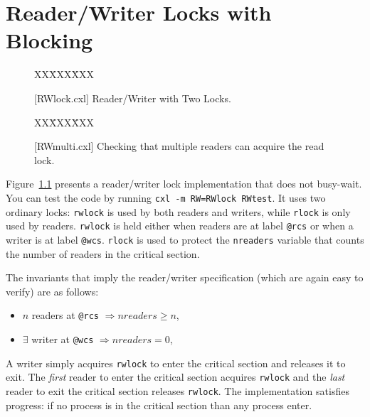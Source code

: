 \documentclass{report}
\newcommand{\cxlsource}[1]{
\begin{tabbing}
XX\=XXX\=XXX\kill
    
\end{tabbing}
}
\newenvironment{code}{
\tcolorbox
}{
\endtcolorbox
}
\begin{document}
\chapter{Reader/Writer Locks with Blocking}
\label{ch:rdwr2}

\begin{figure}
\begin{code}
\cxlsource{RWlock}
\end{code}
\caption{[RWlock.cxl] Reader/Writer with Two Locks.}
\label{fig:rw2lock}
\end{figure}

\begin{figure}
\begin{code}
\cxlsource{RWmulti}
\end{code}
\caption{[RWmulti.cxl] Checking that multiple readers can acquire the read lock.}
\label{fig:rwmulti}
\end{figure}

Figure~\ref{fig:rw2lock} presents a reader/writer lock implementation
that does not busy-wait.
You can test the code by running \texttt{cxl -m RW=RWlock RWtest}.
It uses two ordinary locks: \texttt{rwlock} is used by both readers and writers,
while \texttt{rlock} is only used by readers.
\texttt{rwlock} is held either when readers are at label \texttt{@rcs}
or when a writer is at label \texttt{@wcs}.
\texttt{rlock} is used to protect the \texttt{nreaders} variable that
counts the number of readers in the critical section. 

The invariants that imply the reader/writer specification
(which are again easy to verify) are as follows:

\begin{itemize}
\item $n$ readers at \texttt{@rcs} $\Rightarrow \mathit{nreaders} \ge n$,
\item $\exists$ writer at \texttt{@wcs} $\Rightarrow \mathit{nreaders} = 0$,
\end{itemize}

A writer simply acquires \texttt{rwlock} to enter the critical section
and releases it to exit.  The \emph{first} reader to enter the critical
section acquires \texttt{rwlock} and the \emph{last} reader to exit
the critical section releases \texttt{rwlock}.
The implementation satisfies progress: if no process is in the critical
section than any process enter.
\end{document}
